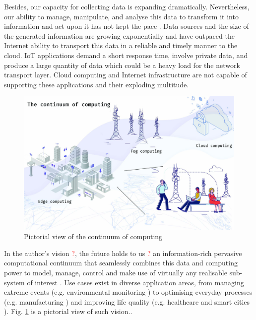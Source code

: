 Besides, our capacity for collecting data is expanding dramatically. Nevertheless, our ability to manage, manipulate, and analyse this data to transform it into information and act upon it has not kept the pace \cite{computing-in-continuum}. Data sources and the size of the generated information are growing exponentially and have outpaced the Internet ability to transport this data in a reliable and timely manner to the cloud. IoT applications demand a short response time, involve private data, and produce a large quantity of data which could be a heavy load for the network transport layer. Cloud computing and Internet infrastructure are not capable of supporting these applications and their exploding multitude.

\begin{figure}[h]
\centering
\includegraphics[width=\textwidth]{figures/continuum}
\caption{Pictorial view of the continuum of computing \label{fig:continuum}}
\end{figure}

In the author's vision \textcolor{red}{?}, the future holds to us \textcolor{red}{?} an information-rich pervasive computational continuum that seamlessly combines this data and computing power to model, manage, control and make use of virtually any realisable sub-system of interest \cite{computing-in-continuum}. Use cases exist in diverse application areas, from managing extreme events (e.g. environmental monitoring \cite{levee}) to optimising everyday processes (e.g. manufacturing \cite{iot-manifacturing}) and improving life quality (e.g. healthcare \cite{iot-healthcare} and smart cities \cite{data-analytics-iot}). Fig. \ref{fig:continuum} is a pictorial view of such vision..

